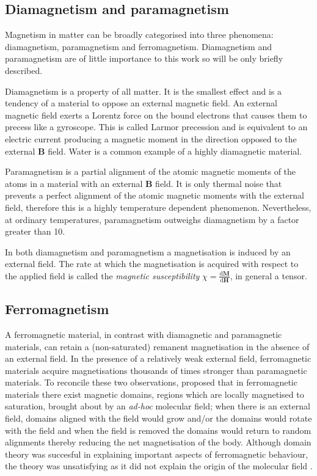 \subsection{Diamagnetism and paramagnetism}
Magnetism in matter can be broadly categorised into three phenomena: diamagnetism, paramagnetism and ferromagnetism. Diamagnetism and paramagnetism are of little importance to this work so will be only briefly described.\par

Diamagnetism is a property of all matter. It is the smallest effect and is a tendency of a material to oppose an external magnetic field. An external magnetic field exerts a Lorentz force on the bound electrons that causes them to precess like a gyroscope. This is called Larmor precession and is equivalent to an electric current producing a magnetic moment in the direction opposed to the external $\boldsymbol{B}$ field. Water is a common example of a highly diamagnetic material.\par

Paramagnetism is a partial alignment of the atomic magnetic moments of the atoms in a material with an external $\boldsymbol{B}$ field. It is only thermal noise that prevents a perfect alignment of the atomic magnetic moments with the external field, therefore this is a highly temperature dependent phenomenon. Nevertheless, at ordinary temperatures, paramagnetism outweighs diamagnetism by a factor greater than 10.\par

In both diamagnetism and paramagnetism a magnetisation is induced by an external field. The rate at which the magnetisation is acquired with respect to the applied field is called the \textit{magnetic susceptibility} $\chi = \frac{\text{d}\boldsymbol{M}}{\text{d}\boldsymbol{H}}$, in general a tensor.\par

\subsection{Ferromagnetism}
A ferromagnetic material, in contrast with diamagnetic and paramagnetic materials, can retain a (non-saturated) remanent magnetisation in the absence of an external field. In the presence of a relatively weak external field, ferromagnetic materials acquire magnetisations thousands of times stronger than paramagnetic materials. To reconcile these two observations, \cite{Weiss1906} proposed that in ferromagnetic materials there exist magnetic domains, regions which are locally magnetised to saturation, brought about by an \emph{ad-hoc} molecular field; when there is an external field, domains aligned with the field would grow and/or the domains would rotate with the field and when the field is removed the domains would return to random alignments thereby reducing the net magnetisation of the body. Although domain theory was succesful in explaining important aspects of ferromagnetic behaviour, the theory was unsatisfying as it did not explain the origin of the molecular field \citep{Kittel1949}.

